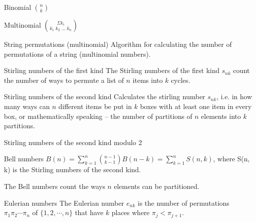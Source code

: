 

\begin{algorithm}{Binomial $\binom{n}{k}$}
\end{algorithm}

\begin{algorithm}{Multinomial $\binom{\Sigma k_i}{k_1\;k_2\;\ldots\;k_n}$}
\end{algorithm}

\begin{algorithm}{String permutations (multinomial)}
\desc
Algorithm for calculating the number of permutations of a string
(multinomial numbers).
\end{algorithm}

\begin{algorithm}{Stirling numbers of the first kind}
\desc
The Stirling numbers of the first kind $s_{nk}$ count the number of
ways to permute a list of $n$ items into $k$ cycles.
\end{algorithm}

\begin{algorithm}{Stirling numbers of the second kind}
\desc
Calculates the stirling number $s_{nk}$, i.e. in how many ways can $n$
different items be put in $k$ boxes with at least one item in every
box, or mathematically speaking -- the number of partitions of $n$
elements into $k$ partitions.
\end{algorithm}

\begin{algorithm}{Stirling numbers of the second kind modulo 2}
\end{algorithm}


\begin{algorithm}{Bell numbers}
\desc
$B(n) = \sum_{k=1}^n {n-1 \choose k-1} B(n-k) = \sum_{k=1}^n S(n,k)$,
where S(n, k) is the Stirling numbers of the second kind.

The Bell numbers count the ways $n$ elements can be partitioned.
\end{algorithm}

\begin{algorithm}{Eulerian numbers}
\desc
The Eulerian number $e_{nk}$ is the number of permutations $\pi_1
\pi_2 \cdots \pi_n$ of $\{1,2,\cdots,n\}$ that have $k$ places where
$\pi_j < \pi_{j+1}$.
\end{algorithm}

